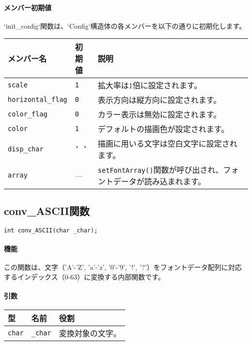 \documentclass[uplatex]{jsarticle}
\begin{document}
\paragraph{メンバー初期値}
`init\_config`関数は、`Config`構造体の各メンバーを以下の通りに初期化します。
\begin{center}
    \begin{tabular}{|l|l|p{6cm}|}
        \hline
        \textbf{メンバー名} & \textbf{初期値} & \textbf{説明} \\ \hline
        \texttt{scale} & \texttt{1} & 拡大率は1倍に設定されます。 \\ \hline
        \texttt{horizontal\_flag} & \texttt{0} & 表示方向は縦方向に設定されます。 \\ \hline
        \texttt{color\_flag} & \texttt{0} & カラー表示は無効に設定されます。 \\ \hline
        \texttt{color} & \texttt{1} & デフォルトの描画色が設定されます。 \\ \hline
        \texttt{disp\_char} & \texttt{' '} & 描画に用いる文字は空白文字に設定されます。 \\ \hline
        \texttt{array} & --- & \texttt{setFontArray()}関数が呼び出され、フォントデータが読み込まれます。 \\ \hline
    \end{tabular}
\end{center}


\subsection{conv\_ASCII関数}
\texttt{int conv\_ASCII(char \_char);}
\paragraph{機能}
この関数は、文字（'A'-'Z', 'a'-'z', '0'-'9', '!', '?'）をフォントデータ配列に対応するインデックス（0-63）に変換する内部関数です。

\paragraph{引数}
\begin{center}
    \begin{tabular}{|l|l|p{7.5cm}|}
        \hline
        \textbf{型} & \textbf{名前} & \textbf{役割} \\ \hline
        \texttt{char} & \texttt{\_char} & 変換対象の文字。 \\ \hline
    \end{tabular}
\end{center}
\end{document}
